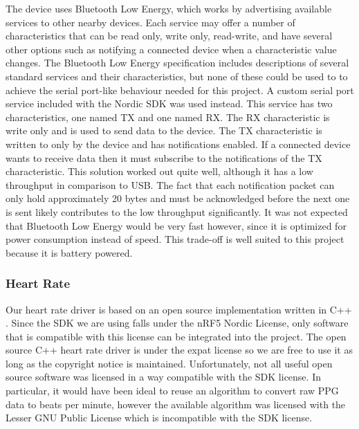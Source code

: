 The device uses Bluetooth Low Energy, which works by advertising
available services to other nearby devices. Each service may offer a number
of characteristics that can be read only, write only, read-write, and have 
several other options such as notifying a connected device when a characteristic
value changes. The Bluetooth Low Energy specification includes descriptions of several
standard services and their characteristics, but none of these could be used to
to achieve the serial port-like behaviour needed for this project. A custom
serial port service included with the Nordic SDK was used instead. This service
has two characteristics, one named TX and one named RX. The RX characteristic is
write only and is used to send data to the device. The TX characteristic is
written to only by the device and has notifications enabled. If a connected device
wants to receive data then it must subscribe to the notifications of the TX 
characteristic. This solution worked out quite well, although it has a low 
throughput in comparison to USB. The fact that each notification packet can only 
hold approximately 20 bytes and must be acknowledged before the next one is 
sent likely contributes to the low throughput significantly. It was not expected
that Bluetooth Low Energy would be very fast however, since it is optimized for 
power consumption instead of speed. This trade-off is well suited to this project 
because it is battery powered.

\subsubsection{Heart Rate}

Our heart rate driver is based on an open source implementation written in
C++ \cite{max86150-ardino}. Since the SDK we are using falls under the nRF5
Nordic License, only software that is compatible with this license can be
integrated into the project. The open source C++ heart rate driver is under the
expat license so we are free to use it as long as the copyright notice is
maintained. Unfortunately, not all useful open source software was licensed in
a way compatible with the SDK license. In particular, it would have been ideal
to reuse an algorithm to convert raw PPG data to beats per minute, however the
available algorithm was licensed with the Lesser GNU Public
License \cite{wasp-os} which is incompatible with the SDK license.
